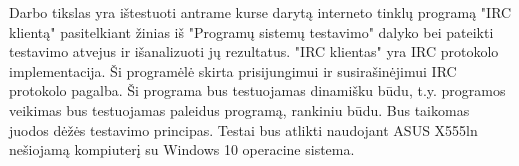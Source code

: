 
Darbo tikslas yra ištestuoti antrame kurse darytą interneto tinklų programą "IRC klientą" pasitelkiant žinias iš "Programų sistemų testavimo" dalyko bei pateikti testavimo atvejus ir išanalizuoti jų rezultatus.
"IRC klientas" yra IRC protokolo implementacija. Ši programėlė skirta prisijungimui ir susirašinėjimui IRC protokolo pagalba.
Ši programa bus testuojamas dinamišku būdu, t.y. programos veikimas bus testuojamas paleidus programą, rankiniu būdu.
Bus taikomas juodos dėžės testavimo principas.
Testai bus atlikti naudojant ASUS X555ln nešiojamą kompiuterį su Windows 10 operacine sistema.
